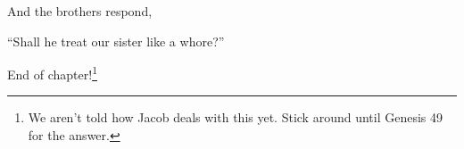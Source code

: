 {
}
{
}
{
	And the brothers respond,

	``Shall he treat our sister like a whore?''

	End of chapter!\footnote{
		We aren't told how Jacob deals with this yet.
		Stick around until Genesis 49 for the answer.
	}

}
